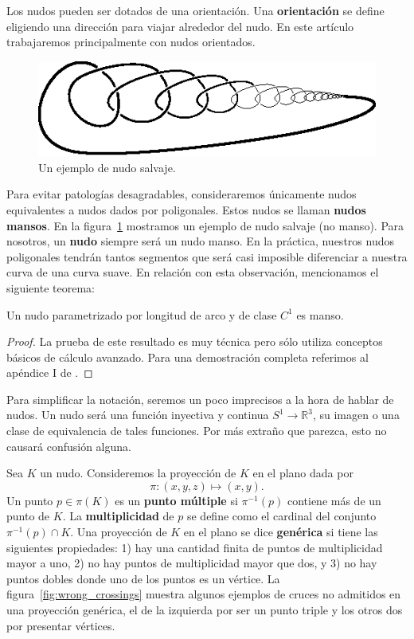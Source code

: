 \documentclass[graybox]{svmult}
\newcommand{\R}{\mathbb{R}}
\begin{document}
Los nudos pueden ser dotados de una orientación.  Una \textbf{orientación} se
define eligiendo una dirección para viajar alrededor del nudo. En este artículo
trabajaremos principalmente con nudos orientados.
		
\begin{figure}
	\centering
	\includegraphics[scale=0.7]{images/wild}
	\caption{Un ejemplo de nudo salvaje.}
	\label{fig:wild}
\end{figure}

	 Para evitar patologías desagradables, consideraremos
	 únicamente nudos equivalentes a nudos dados por poligonales. Estos nudos se
	 llaman \textbf{nudos mansos}.  En la figura~\ref{fig:wild} mostramos un
	 ejemplo de nudo salvaje (no manso). Para nosotros, un \textbf{nudo} siempre
	 será un nudo manso. 
	 En la práctica, nuestros nudos poligonales tendrán tantos segmentos que
	 será casi imposible diferenciar a nuestra curva de una curva suave.  En
	 relación con esta observación, mencionamos el siguiente teorema:

    \begin{theorem}
        Un nudo parametrizado por longitud de arco y de clase $C^1$ es manso.
    \end{theorem}

    \begin{proof}
		La prueba de este resultado es muy técnica pero sólo utiliza conceptos
		básicos de cálculo avanzado.  Para una demostración completa referimos
		al apéndice I de \cite{MR0445489}.
    \end{proof}

	Para simplificar la notación, seremos un poco imprecisos a la hora
    de hablar de nudos.  Un nudo será una función inyectiva y
    continua $S^1\to\R^3$, su imagen o 
	una clase de equivalencia de tales funciones. 
	Por
    más extraño que parezca, esto no causará confusión alguna.

	Sea $K$ un nudo.  Consideremos la proyección de $K$ en el plano dada por
    \[
	\pi\colon(x,y,z)\mapsto(x,y).
	\]
	Un punto $p\in\pi(K)$ es un \textbf{punto
    múltiple} si $\pi^{-1}(p)$ contiene más de un punto de $K$. La
    \textbf{multiplicidad} de $p$ se define como el cardinal del conjunto
    $\pi^{-1}(p)\cap K$. Una proyección de $K$ en el plano se dice
    \textbf{genérica} si tiene las siguientes propiedades: 1) hay una cantidad finita de puntos
    de multiplicidad mayor a uno, 2) no hay puntos de multiplicidad mayor que 
    dos, y 3) no hay puntos dobles donde uno de los puntos es un vértice. La
    figura~\ref{fig:wrong_crossings} muestra algunos ejemplos de cruces no
    admitidos en una proyección genérica, el de la izquierda por ser un punto triple y los otros dos por presentar
    vértices. 
 
\end{document}
